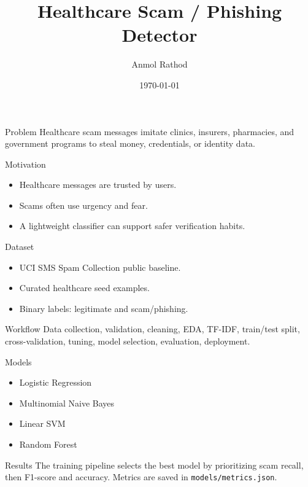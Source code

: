 \documentclass{beamer}
\title{Healthcare Scam / Phishing Detector}
\author{Anmol Rathod}
\date{\today}
\begin{document}
\begin{frame}
\titlepage
\end{frame}

\begin{frame}{Problem}
Healthcare scam messages imitate clinics, insurers, pharmacies, and government programs to steal money, credentials, or identity data.
\end{frame}

\begin{frame}{Motivation}
\begin{itemize}
\item Healthcare messages are trusted by users.
\item Scams often use urgency and fear.
\item A lightweight classifier can support safer verification habits.
\end{itemize}
\end{frame}

\begin{frame}{Dataset}
\begin{itemize}
\item UCI SMS Spam Collection public baseline.
\item Curated healthcare seed examples.
\item Binary labels: legitimate and scam/phishing.
\end{itemize}
\end{frame}

\begin{frame}{Workflow}
Data collection, validation, cleaning, EDA, TF-IDF, train/test split, cross-validation, tuning, model selection, evaluation, deployment.
\end{frame}

\begin{frame}{Models}
\begin{itemize}
\item Logistic Regression
\item Multinomial Naive Bayes
\item Linear SVM
\item Random Forest
\end{itemize}
\end{frame}

\begin{frame}{Results}
The training pipeline selects the best model by prioritizing scam recall, then F1-score and accuracy. Metrics are saved in \texttt{models/metrics.json}.
\end{frame}
\end{document}
